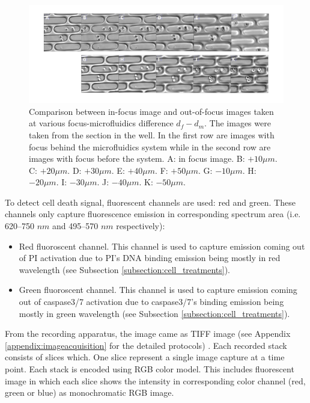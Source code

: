 \documentclass[pdftex,12pt,a4paper]{report}
\begin{document}
\begin{figure}[H]
\centering
\includegraphics[width=\textwidth]{images/focus/pict.png}
\caption{Comparison between in-focus image and out-of-focus images taken at various focus-microfluidics difference $d_f - d_m$. The images were taken from the section in the well. In the first row are images with focus behind the microfluidics system while in the second row are images with focus before the system. A: in focus image. B: $+10 \mu m$. C: $+20 \mu m$. D: $+30 \mu m$. E: $+40 \mu m$. F: $+50 \mu m$. G: $-10 \mu m$. H: $-20 \mu m$. I: $-30 \mu m$. J: $-40 \mu m$. K: $-50 \mu m$.}
\label{fig:focustest}
\end{figure}

To detect cell death signal, fluorescent channels are used: red and green. These channels only capture fluorescence emission in corresponding spectrum area (i.e. 620–750 $nm$ and 495–570 $nm$ respectively):

\begin{itemize}
\item Red fluoroscent channel. This channel is used to capture emission coming out of PI activation due to PI's DNA binding emission being mostly in red wavelength (see Subsection \ref{subsection:cell_treatments}).
\item Green fluoroscent channel. This channel is used to capture emission coming out of caspase3/7 activation due to caspase3/7's binding emission being mostly in green wavelength (see Subsection \ref{subsection:cell_treatments}).
\end{itemize}

From the recording apparatus, the image came as TIFF image (see Appendix \ref{appendix:imageacquisition} for the detailed protocols) \cite{loc2006tiff}. Each recorded stack consists of slices which. One slice represent a single image capture at a time point. Each stack is encoded using RGB color model. This includes fluorescent image in which each slice shows the intensity in corresponding color channel (red, green or blue) as monochromatic RGB image. 
\end{document}
